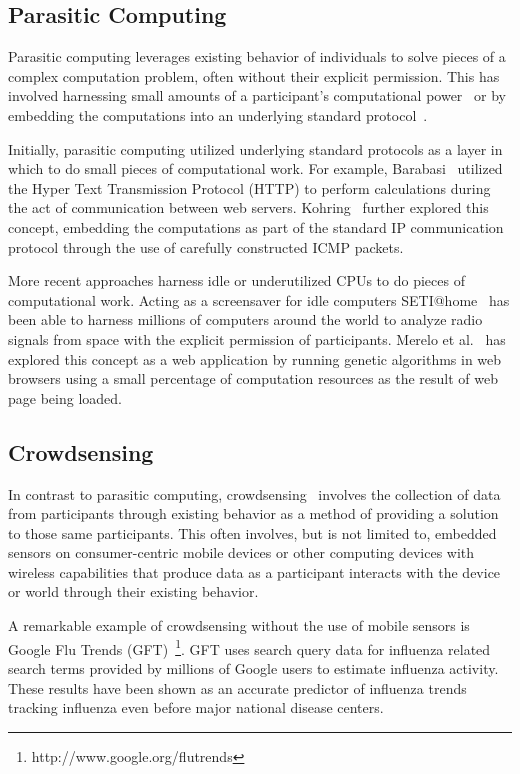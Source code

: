 \documentclass[10pt,twocolumn]{article}
\begin{document}
\subsection{Parasitic Computing~\cite{Barabasi2001}}
\label{sec:parastici-computing}
Parasitic computing leverages existing behavior of individuals to 
solve pieces of a complex computation problem, often without their
explicit permission. This has involved harnessing small amounts of
a participant's computational 
power~\cite{Anderson2002,Merelo2007,Merelo-Guervos2008} or by 
embedding the computations into an underlying standard 
protocol~\cite{Barabasi2001,Kohring2003}.

Initially, parasitic computing utilized underlying standard protocols
as a layer in which to do small pieces of computational work. For 
example, Barabasi~\cite{Barabasi2001} utilized the Hyper Text 
Transmission Protocol (HTTP) to perform calculations during the act 
of communication between web servers. Kohring~\cite{Kohring2003}
further explored this concept, embedding the computations as part of 
the standard IP communication protocol through the use of carefully
constructed ICMP packets.

More recent approaches harness idle or underutilized CPUs to do
pieces of computational work. Acting as a screensaver for idle 
computers SETI@home~\cite{Anderson2002} has been able to harness 
millions of computers around the world to analyze radio signals 
from space with the explicit permission of participants. Merelo 
et al.~\cite{Merelo2007,Merelo-Guervos2008} has explored this 
concept as a web application by running genetic algorithms in web 
browsers using a small percentage of computation resources as the 
result of web page being loaded.


\subsection{Crowdsensing}
\label{sec:crowdsensing}
In contrast to parasitic computing, crowdsensing~\cite{Ganti2011} 
involves the collection of data from participants through existing 
behavior as a method of providing a solution to those same participants.
This often involves, but is not limited to, embedded sensors on 
consumer-centric mobile devices or other computing devices with wireless 
capabilities that produce data as a participant interacts with the device 
or world through their existing behavior.

A remarkable example of crowdsensing without the use of mobile sensors is
Google Flu Trends (GFT)~\footnote{http://www.google.org/flutrends}. 
GFT uses search query data for influenza related search terms provided 
by millions of Google users to estimate influenza activity. These 
results have been shown as an accurate predictor of influenza 
trends~\cite{Dugas2012} tracking influenza even before 
major national disease centers.
\end{document}
